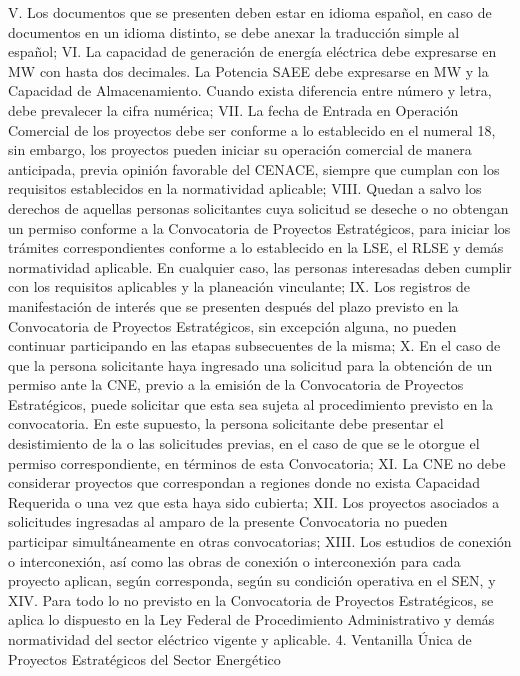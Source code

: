 V. Los documentos que se presenten deben estar en idioma español, en caso de documentos en un idioma distinto, se debe anexar la traducción simple al español;
VI. La capacidad de generación de energía eléctrica debe expresarse en MW con hasta dos decimales. La Potencia SAEE debe expresarse en MW y la Capacidad de Almacenamiento. Cuando exista diferencia entre número y letra, debe prevalecer la cifra numérica;
VII. La fecha de Entrada en Operación Comercial de los proyectos debe ser conforme a lo establecido en el numeral 18, sin embargo, los proyectos pueden iniciar su operación comercial de manera anticipada, previa opinión favorable del CENACE, siempre que cumplan con los requisitos establecidos en la normatividad aplicable;
VIII. Quedan a salvo los derechos de aquellas personas solicitantes cuya solicitud se deseche o no obtengan un permiso conforme a la Convocatoria de Proyectos Estratégicos, para iniciar los trámites correspondientes conforme a lo establecido en la LSE, el RLSE y demás normatividad aplicable. En cualquier caso, las personas interesadas deben cumplir con los requisitos aplicables y la planeación vinculante;
IX. Los registros de manifestación de interés que se presenten después del plazo previsto en la Convocatoria de Proyectos Estratégicos, sin excepción alguna, no pueden continuar participando en las etapas subsecuentes de la misma;
X. En el caso de que la persona solicitante haya ingresado una solicitud para la obtención de un permiso ante la CNE, previo a la emisión de la Convocatoria de Proyectos Estratégicos, puede solicitar que esta sea sujeta al procedimiento previsto en la convocatoria. En este supuesto, la persona solicitante debe presentar el desistimiento de la o las solicitudes previas, en el caso de que se le otorgue el permiso correspondiente, en términos de esta Convocatoria;
XI. La CNE no debe considerar proyectos que correspondan a regiones donde no exista Capacidad Requerida o una vez que esta haya sido cubierta;
XII. Los proyectos asociados a solicitudes ingresadas al amparo de la presente Convocatoria no pueden participar simultáneamente en otras convocatorias;
XIII. Los estudios de conexión o interconexión, así como las obras de conexión o interconexión para cada proyecto aplican, según corresponda, según su condición operativa en el SEN, y
XIV. Para todo lo no previsto en la Convocatoria de Proyectos Estratégicos, se aplica lo dispuesto en la Ley Federal de Procedimiento Administrativo y demás normatividad del sector eléctrico vigente y aplicable.
4. Ventanilla Única de Proyectos Estratégicos del Sector Energético
